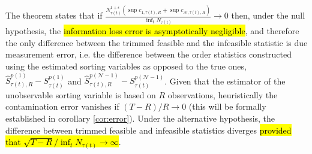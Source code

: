 \noindent
The theorem states that if $\frac{N_{\tau(t)}^{1+\epsilon} \left( \sup c_{1,\tau(t),R} + \sup c_{\mathcal{N},\tau(t),R} \right)}{\inf_{t}N_{\tau(t)}} \rightarrow 0$ then, under the null hypothesis, the \hl{information loss error is asymptotically negligible}, and therefore the only difference between the trimmed feasible and the infeasible statistic is due measurement error, i.e. the difference between the order statistics constructed using the estimated sorting variables as opposed to the true ones, $\widehat{S}_{\tau(t),R}^{p(1)}-S_{\tau(t)}^{p(1)}$ and $\widehat{S}_{\tau(t),R}^{p(\mathcal{N}-1)}-S_{\tau(t)}^{p(\mathcal{N}-1)}$. Given that the estimator of the unobservable sorting variable is based on $R$ observations, heuristically the contamination error vanishes if $(T-R)/R \rightarrow 0$ (this will be formally established in corollary \ref{cor:error}). Under the alternative hypothesis, the difference between trimmed feasible and infeasible statistics diverges \hl{provided that $\sqrt{T-R} / \inf_{t}N_{\tau(t)}\rightarrow \infty$}.



